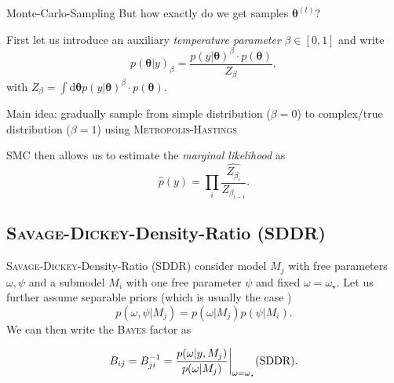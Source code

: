\documentclass[11pt,aspectratio=1610,dvipsnames]{beamer}
\newcommand{\btheta}{\boldsymbol{\theta}}
\begin{document}
\begin{frame}{Monte-Carlo-Sampling}
	But how exactly do we get samples $\btheta^{(t)}$?
			\begin{tcolorbox}[colback=black!5,colframe=gray!15!black,title={Sequential Monte Carlo (SMC)}]
				First let us introduce an auxiliary \emph{temperature parameter} $\beta\in [0,1]$ and write
				$$p(\btheta|y)_\beta=\frac{p(y|\btheta)^\beta\cdot p(\btheta)}{Z_\beta},$$
				with $Z_\beta=\int\text{d}\btheta p(y|\btheta)^\beta\cdot p(\btheta)$.
				
				Main idea: gradually sample from simple distribution ($\beta=0$) to complex/true distribution ($\beta=1$) using \textsc{Metropolis-Hastings}
				
				SMC then allows us to estimate the \emph{marginal likelihood} as 
				\begin{equation}\label{eq:with_the_hat}
				\hat{p}(y)=\prod_{i}\widehat{\frac{Z_{\beta_i}}{Z_{\beta_{i-1}}}}.
				\end{equation}
		\end{tcolorbox}
\end{frame}


\subsection{\textsc{Savage-Dickey}-Density-Ratio (SDDR)}
\begin{frame}{\textsc{Savage-Dickey}-Density-Ratio (SDDR)}
	consider model $M_j$ with free parameters $\omega,\psi$ and a submodel $M_i$ with one free parameter $\psi$ and fixed $\omega=\omega_\star$. Let us further assume separable priors (which is usually the case \citet{trotta}) $$p(\omega,\psi|M_j)=p(\omega|M_j)p(\psi|M_i).$$
	We can then write the \textsc{Bayes} factor as \citet{trotta} 
	
\begin{tcolorbox}[colback=black!5,colframe=gray!15!black,title={Savage Dickey-Density-Ratio}]
	\begin{equation}
	\label{eq:sddr}
	B_{ij}=B_{ji}^{-1}=\frac{p(\omega|y,M_j)}{p(\omega|M_j)}\bigg|_{\omega=\omega_\star}  \text{\hfill (SDDR)}.
	\end{equation}
\end{tcolorbox}
\end{frame}
%
\end{document}
